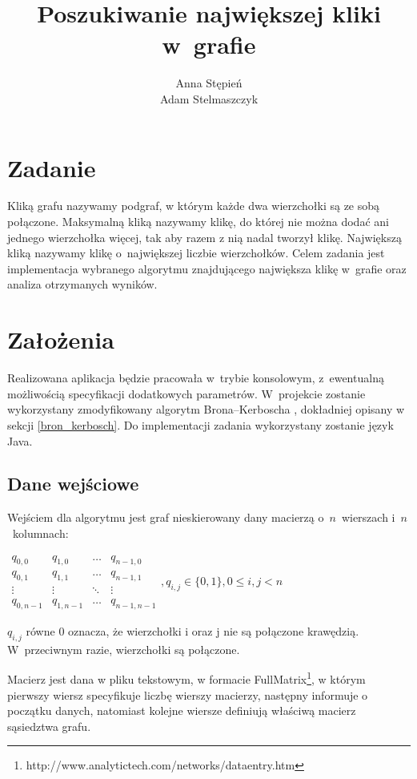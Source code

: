 \documentclass[12pt, a4paper]{article}
\title{\textbf{Poszukiwanie największej kliki w~grafie}}
\author{Anna Stępień \\ Adam Stelmaszczyk}
\date{}
\begin{document}
\maketitle
\tableofcontents

\newpage
\section{Zadanie}

Kliką grafu nazywamy podgraf, w którym każde dwa wierzchołki są ze sobą połączone.
Maksymalną kliką nazywamy klikę, do której nie można dodać ani jednego wierzchołka więcej, tak aby razem z nią nadal tworzył klikę.
Największą kliką nazywamy klikę o~największej liczbie wierzchołków.
Celem zadania jest implementacja wybranego algorytmu znajdującego największa klikę w~grafie oraz analiza otrzymanych wyników.

\section{Założenia}
Realizowana aplikacja będzie pracowała w~trybie konsolowym, z~ewentualną możliwością specyfikacji dodatkowych parametrów.
W~projekcie zostanie wykorzystany zmodyfikowany algorytm Brona--Kerboscha \cite{bk}, dokładniej opisany w sekcji \ref{bron_kerbosch}.
Do implementacji zadania wykorzystany zostanie język Java.

\subsection{Dane wejściowe}
Wejściem dla algorytmu jest graf nieskierowany dany macierzą o~$n$~wierszach i~$n$~kolumnach:

\bigskip
$ 
\begin{array}{cccc}
q_{0,0} & q_{1,0} & \ldots & q_{n-1,0} \\
q_{0,1} & q_{1,1} & \ldots & q_{n-1,1} \\
\vdots  & \vdots  & \ddots & \vdots  \\
q_{0,n-1} & q_{1,n-1} & \ldots & q_{n-1,n-1} 
\end{array}
, q_{i,j} \in \{0,1\}, 0 \leq i,j < n
$
\bigskip

$q_{i,j}$ równe 0 oznacza, że wierzchołki i oraz j nie są połączone krawędzią. W~przeciwnym razie, wierzchołki są połączone.
\par\vspace{\baselineskip}
Macierz jest dana w pliku tekstowym, w formacie FullMatrix\footnote{{http://www.analytictech.com/networks/dataentry.htm}}, w którym pierwszy wiersz specyfikuje liczbę wierszy macierzy, następny informuje o początku danych, natomiast kolejne wiersze definiują właściwą macierz sąsiedztwa grafu.
\end{document}
